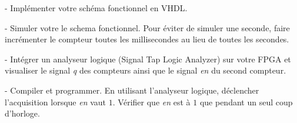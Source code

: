 - Implémenter votre schéma fonctionnel en VHDL.

\medskip

- Simuler votre le schema fonctionnel. Pour éviter de simuler une seconde, faire incrémenter le compteur toutes les millisecondes au lieu de toutes les secondes.

\medskip

- Intégrer un analyseur logique (Signal Tap Logic Analyzer) sur votre FPGA et visualiser le signal \textit{q} des compteurs ainsi que le signal \textit{en} du second compteur.

\medskip

- Compiler et programmer. En utilisant l'analyseur logique, déclencher l'acquisition lorsque \textit{en} vaut $1$. Vérifier que \textit{en} est à $1$ que pendant un seul coup d'horloge.

